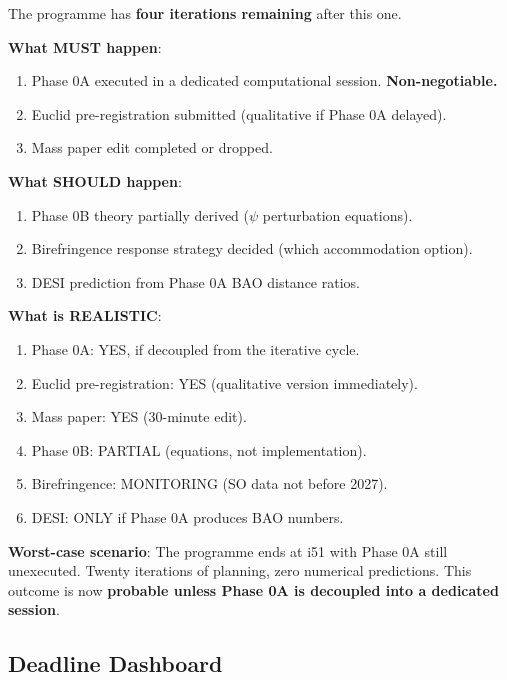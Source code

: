 \documentclass[11pt,a4paper]{article}
\begin{document}
\begin{tcolorbox}[colback=red!5!white, colframe=red!60!black,
  title={Programme Trajectory: 4 Iterations Remaining (i48--i51)}]

The programme has \textbf{four iterations remaining} after this one.

\textbf{What MUST happen}:
\begin{enumerate}
\item Phase 0A executed in a dedicated computational session. \textbf{Non-negotiable.}
\item Euclid pre-registration submitted (qualitative if Phase 0A delayed).
\item Mass paper edit completed or dropped.
\end{enumerate}

\textbf{What SHOULD happen}:
\begin{enumerate}
\item Phase 0B theory partially derived ($\psi$ perturbation equations).
\item Birefringence response strategy decided (which accommodation option).
\item DESI prediction from Phase 0A BAO distance ratios.
\end{enumerate}

\textbf{What is REALISTIC}:
\begin{enumerate}
\item Phase 0A: YES, if decoupled from the iterative cycle.
\item Euclid pre-registration: YES (qualitative version immediately).
\item Mass paper: YES (30-minute edit).
\item Phase 0B: PARTIAL (equations, not implementation).
\item Birefringence: MONITORING (SO data not before 2027).
\item DESI: ONLY if Phase 0A produces BAO numbers.
\end{enumerate}

\textbf{Worst-case scenario}: The programme ends at i51 with Phase 0A still unexecuted. Twenty iterations of planning, zero numerical predictions. This outcome is now \textbf{probable unless Phase 0A is decoupled into a dedicated session}.
\end{tcolorbox}

\subsection{Deadline Dashboard}
\end{document}

